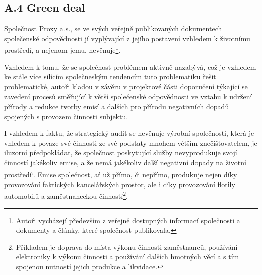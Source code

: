 \subsection*{A.4 Green deal}
\label{sec:Green deal}

Společnost Proxy a.s., se ve svých veřejně publikovaných dokumentech společenské odpovědnosti jí vyplývající z jejího postavení vzhledem k životnímu prostředí, a nejenom jemu, nevěnuje\footnote{Autoři vycházejí především z veřejně dostupných informací společnosti a dokumenty a články, které společnost publikovala.}.\\


\vspace*{-1mm}

Vzhledem k tomu, že se společnost problémem aktivně nazabývá, což je vzhledem ke stále více sílícím společneským tendencím tuto problematiku řešit problematické, autoři kladou v závěru v projektové části doporučení týkající se zavedení procesů směřující k větší společenské odpovědnosti ve vztahu k udržení přírody a redukce tvorby emisí a dalších pro přírodu negativních dopadů spojených s provozem činnosti subjektu.\\

\vspace*{-1mm}

I vzhledem k faktu, že strategický audit se nevěnuje výrobní společnosti, která je vhledem k povaze své činnosti ze své podstaty mnohem větším znečišťovatelem, je iluzorní předpokládat, že společnost poskytující služby nevyprodukuje svojí činností jakékoliv emise, a že nemá jakékoliv další negativní dopady na životní prostředí\textsuperscript{,}. Emise společnost, ať už přímo, či nepřímo, produkuje nejen díky provozování faktických kancelářských prostor, ale i díky provozování flotily automobilů a zaměstnaneckou činností\footnote{Příkladem je doprava do místa výkonu činnosti zaměstnanců, používání elektroniky k výkonu činnosti a používání dalších hmotných věcí a s tím spojenou nutností jejich produkce a likvidace.}. 




